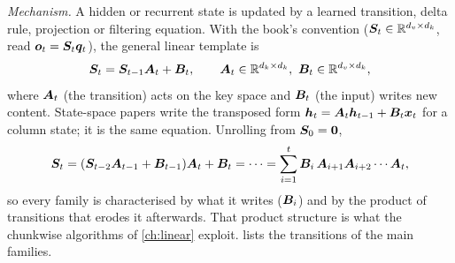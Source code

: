 \emph{Mechanism.} A hidden or recurrent state is updated by a learned transition, delta rule,
projection or filtering equation. With the book's convention ($\bm{S}_t \in \mathbb{R}^{d_v\times d_k}$, read
$\bm{o}_t = \bm{S}_t\bm{q}_t$), the general linear template is
\begin{equation}\label{eq:c02-transition}
  \mS_t = \mS_{t-1}\mA_t + \mB_t, \qquad \mA_t \in \R^{d_k\times d_k},\ \mB_t\in\R^{d_v\times d_k},
\end{equation}
where $\bm{A}_t$ (the transition) acts on the key space and $\bm{B}_t$ (the input) writes new content.
State-space papers write the transposed form $\bm{h}_t = \bm{A}_t\bm{h}_{t-1} + \bm{B}_t\bm{x}_t$ for a column
state; it is the same equation. Unrolling from $\bm{S}_0 = \mathbf{0}$,
\begin{equation}\label{eq:c02-transition-unrolled}
  \bm{S}_t = (\bm{S}_{t-2}\bm{A}_{t-1} + \bm{B}_{t-1})\bm{A}_t + \bm{B}_t = \dots
        = \sum_{i=1}^{t}\bm{B}_i\,\bm{A}_{i+1}\bm{A}_{i+2}\cdots\bm{A}_t ,
\end{equation}
so every family is characterised by what it writes ($\bm{B}_i$) and by the product of transitions that
erodes it afterwards. That product structure is what the chunkwise algorithms of \cref{ch:linear}
exploit.  lists the transitions of the main families.

